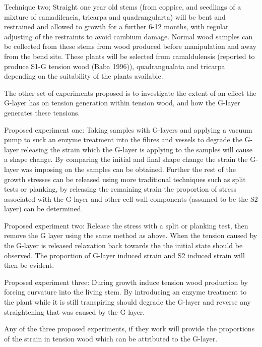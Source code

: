 \documentclass{article}
\begin{document}
Technique two; Straight one year old stems (from coppice, and seedlings of a
mixture of camadilencia, tricarpa and quadrangularta) will be bent and restrained and
allowed to growth for a further 6-12 months, with regular adjusting of the
restraints to avoid cambium damage. Normal wood samples can be collected from
these stems from wood produced before manipulation and away from the bend site.
These plants will be selected from camaldulensis (reported to produce S1-G
tension wood (Baba 1996)), quadrangualata and tricarpa depending on the
suitability of the plants available.

The other set of experiments proposed is to investigate the extent of an effect
the G-layer has on tension generation within tension wood, and how the G-layer
generates these tensions.

Proposed experiment one:
Taking samples with G-layers and applying a vacuum pump to suck an enzyme
treatment into the fibres and vessels to degrade the G-layer releasing the
strain which the G-layer is applying to the samples will cause a shape change.
By comparing the initial and final shape change the strain the G-layer was
imposing on the samples can be obtained. Further the rest of the growth stresses
can be released using more traditional techniques such as split tests or
planking, by releasing the remaining strain the proportion of stress associated
with the G-layer and other cell wall components (assumed to be the S2 layer) can
be determined.

Proposed experiment two:
Release the stress with a split or planking test, then remove the G
layer using the same method as above. When the tension caused by the G-layer is
released relaxation back towards the the initial state should be observed. The
proportion of G-layer induced strain and S2 induced strain will then be
evident.

Proposed experiment three:
During growth induce tension wood production by forcing curvature into the
living stem. By introducing an enzyme treatment to the plant while it is still
transpiring should degrade the G-layer and reverse any straightening that was
caused by the G-layer.

Any of the three proposed experiments, if they work will provide the proportions
of the strain in tension wood which can be attributed to the G-layer.


\end{document}
